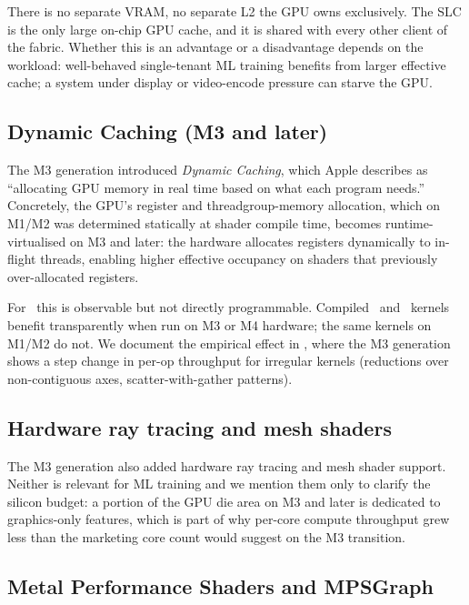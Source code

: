 There is no separate VRAM, no separate L2 the GPU owns exclusively.
The SLC is the only large on-chip GPU cache, and it is shared with
every other client of the fabric. Whether this is an advantage or a
disadvantage depends on the workload: well-behaved single-tenant ML
training benefits from larger effective cache; a system under display
or video-encode pressure can starve the GPU.

\subsection{Dynamic Caching (M3 and later)}
\label{ssec:apple_silicon:gpu_dyncache}

The M3 generation introduced \emph{Dynamic Caching}, which Apple
describes as ``allocating GPU memory in real time based on what each
program needs.'' Concretely, the GPU's register and threadgroup-memory
allocation, which on M1/M2 was determined statically at shader compile
time, becomes runtime-virtualised on M3 and later: the hardware
allocates registers dynamically to in-flight threads, enabling higher
effective occupancy on shaders that previously over-allocated
registers.

For \Lucid\ this is observable but not directly programmable.
Compiled \MLX\ and \MPSGraph\ kernels benefit transparently when run
on M3 or M4 hardware; the same kernels on M1/M2 do not. We document
the empirical effect in , where the M3
generation shows a step change in per-op throughput for irregular
kernels (reductions over non-contiguous axes, scatter-with-gather
patterns).

\subsection{Hardware ray tracing and mesh shaders}
\label{ssec:apple_silicon:gpu_rt}

The M3 generation also added hardware ray tracing and mesh shader
support. Neither is relevant for ML training and we mention them only
to clarify the silicon budget: a portion of the GPU die area on M3
and later is dedicated to graphics-only features, which is part of
why per-core compute throughput grew less than the marketing core
count would suggest on the M3 transition.

\subsection{Metal Performance Shaders and MPSGraph}
\label{ssec:apple_silicon:gpu_mpsg}

